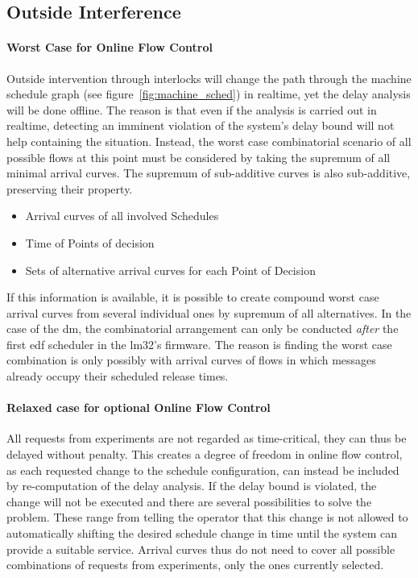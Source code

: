 \subsection{Outside Interference}
\label{ssec:outside_ctrl}
\paragraph{Worst Case for Online Flow Control}
Outside intervention through interlocks will change the path through the machine schedule graph (see figure~\ref{fig:machine_sched}) in realtime, yet the
delay analysis will be done offline. The reason is that even if the analysis is carried out in realtime,
detecting an imminent violation of the system's delay bound will not help containing the situation. Instead, the worst case combinatorial scenario
of all possible flows at this point must be considered by taking the supremum of all minimal arrival curves. The supremum of sub-additive curves is also sub-additive, preserving their property.

\begin{itemize}
\item{Arrival curves of all involved Schedules}
\item{Time of Points of decision}
\item{Sets of alternative arrival curves for each Point of Decision}
\end{itemize}
If this information is available, it is possible to create compound worst case arrival curves from several individual ones by supremum of all alternatives. 
In the case of the \gls{dm}, the combinatorial arrangement can only be conducted \emph{after} the first \gls{edf} scheduler in the \gls{lm32}'s firmware.
The reason is finding the worst case combination is only possibly with arrival curves of flows in which messages already occupy their scheduled release times.

\paragraph{Relaxed case for optional Online Flow Control}
All requests from experiments are not regarded as time-critical, they can thus be delayed without penalty. This creates a degree of freedom in online flow control, as each requested change to the schedule configuration,
can instead be included by re-computation of the delay analysis.  
If the delay bound is violated, the change will not be executed and there are several possibilities to solve the problem. These range from telling the operator
that this change is not allowed to automatically shifting the desired schedule change in time until the system can provide a suitable service. 
Arrival curves thus do not need to cover all possible combinations of requests from experiments, only the ones currently selected.

